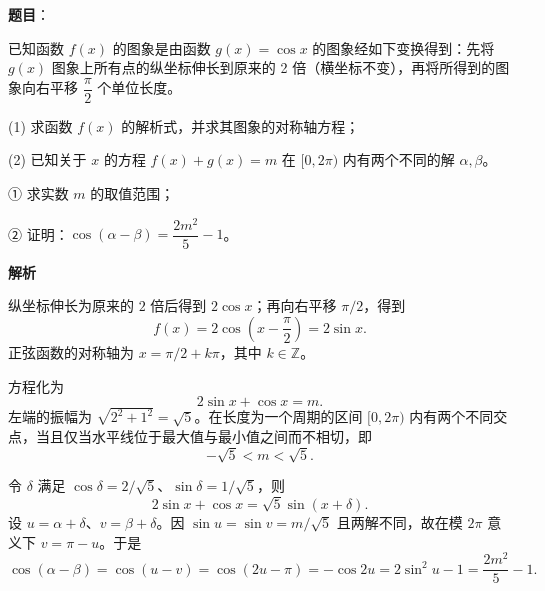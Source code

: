 \begin{answer}

\textbf{题目}：

已知函数 $f(x)$ 的图象是由函数 $g(x)=\cos x$ 的图象经如下变换得到：先将 $g(x)$ 图象上所有点的纵坐标伸长到原来的 2 倍（横坐标不变），再将所得到的图象向右平移 $\dfrac\pi2$ 个单位长度。

(1) 求函数 $f(x)$ 的解析式，并求其图象的对称轴方程；

(2) 已知关于 $x$ 的方程 $f(x)+g(x)=m$ 在 $[0,2\pi)$ 内有两个不同的解 $\alpha,\beta$。

① 求实数 $m$ 的取值范围；

② 证明：$\cos(\alpha-\beta)=\dfrac{2m^2}{5}-1$。

\textbf{解析}


纵坐标伸长为原来的 $2$ 倍后得到 $2\cos x$；再向右平移 $\pi/2$，得到
\nopagebreak[4]
\[
f(x)=2\cos\left(x-\frac\pi2\right)=2\sin x.
\]
正弦函数的对称轴为 $x=\pi/2+k\pi$，其中 $k\in\mathbb Z$。


方程化为
\nopagebreak[4]
\[
2\sin x+\cos x=m.
\]
左端的振幅为 $\sqrt{2^2+1^2}=\sqrt5$。在长度为一个周期的区间 $[0,2\pi)$ 内有两个不同交点，当且仅当水平线位于最大值与最小值之间而不相切，即
\nopagebreak[4]
\[
-\sqrt5<m<\sqrt5.
\]

令 $\delta$ 满足 $\cos\delta=2/\sqrt5$、$\sin\delta=1/\sqrt5$，则
\nopagebreak[4]
\[
2\sin x+\cos x=\sqrt5\sin(x+\delta).
\]
设 $u=\alpha+\delta$、$v=\beta+\delta$。因 $\sin u=\sin v=m/\sqrt5$ 且两解不同，故在模 $2\pi$ 意义下 $v=\pi-u$。于是
\nopagebreak[4]
\[
\cos(\alpha-\beta)=\cos(u-v)
=\cos(2u-\pi)
=-\cos2u
=2\sin^2u-1
=\frac{2m^2}{5}-1.
\]



\end{answer}
